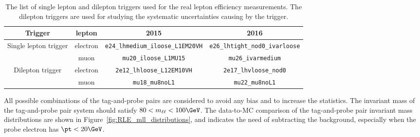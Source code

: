 \begin{table}[htbp]
\begin{center}
\begin{tabular}{cccc}
\hline
\hline
Trigger & lepton & 2015 & 2016\\
\hline
\multirow{2}{*}{Single lepton trigger} & electron & \texttt{e24\_lhmedium\_iloose\_L1EM20VH} & \texttt{e26\_lhtight\_nod0\_ivarloose}\\
& muon & \texttt{mu20\_iloose\_L1MU15} & \texttt{mu26\_ivarmedium}\\
\hline
\multirow{2}{*}{Dilepton trigger} & electron & \texttt{2e12\_lhloose\_L12EM10VH} & \texttt{2e17\_lhvloose\_nod0}\\
& muon & \texttt{mu18\_mu8noL1} & \texttt{mu22\_mu8noL1}\\
\hline
\hline
\end{tabular}
\end{center}
\caption{The list of single lepton and dilepton triggers used for the real lepton efficiency measurements.
The dilepton triggers are used for studying the systematic uncertainties causing by the trigger.}
\label{tab:RLE_single_lepton_triggers}
\end{table}

All possible combinations of the tag-and-probe pairs are considered to avoid any bias and to increase the statistics.
The invariant mass of the tag-and-probe pair system should satisfy $80<m_{\ell\ell}<100 \GeV$.
The data-to-MC comparison of the tag-and-probe pair invariant mass distributions are shown in Figure~\ref{fig:RLE_mll_distributions}, and indicates the need of subtracting the background, especially when the probe electron has $\pt<20 \GeV$.

